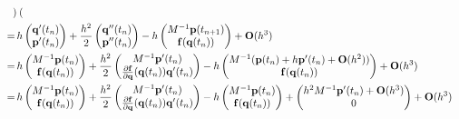 \begin{solution}
\begin{enumerate}[(a)]
\begin{align*}
\begin{pmatrix}
      \end{pmatrix} \\
      =\, & h
      \begin{pmatrix}
        \mb q'(t_n) \\
        \mb p'(t_n)
      \end{pmatrix} + \frac{h^2}{2}
      \begin{pmatrix}
        \mb q''(t_n) \\
        \mb p''(t_n)
      \end{pmatrix} - h
      \begin{pmatrix}
        M^{-1}\mb p(t_{n+1}) \\
        \mb f(\mb q(t_n))
      \end{pmatrix} + \mb O(h^3) \\
      =\, & h
      \begin{pmatrix}
        M^{-1}\mb p(t_n) \\
        \mb f(\mb q(t_n))
      \end{pmatrix} + \frac{h^2}{2}
      \begin{pmatrix}
        M^{-1} \mb p'(t_n) \\
        \frac{\partial \mb f}{\partial \mb q}(\mb q(t_n))\mb q'(t_n)
      \end{pmatrix} - h
      \begin{pmatrix}
        M^{-1}(\mb p(t_n) + h \mb p'(t_n) + \mb O(h^2)) \\
        \mb f(\mb q(t_n))
      \end{pmatrix} + \mb O(h^3) \\
      =\, & h
      \begin{pmatrix}
        M^{-1}\mb p(t_n) \\
        \mb f(\mb q(t_n))
      \end{pmatrix} + \frac{h^2}{2}
      \begin{pmatrix}
        M^{-1} \mb p'(t_n) \\
        \frac{\partial \mb f}{\partial \mb q}(\mb q(t_n))\mb q'(t_n)
      \end{pmatrix} - h
      \begin{pmatrix}
        M^{-1}\mb p(t_n) \\
        \mb f(\mb q(t_n))
      \end{pmatrix} + 
      \begin{pmatrix}
        h^2 M^{-1} \mb p'(t_n) + \mb O(h^3) \\
        0
      \end{pmatrix} +
      \mb O(h^3) \\

\end{align*}
\end{enumerate}
\end{solution}
